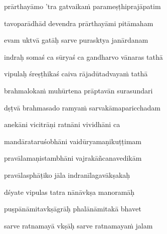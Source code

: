 prārthayāmo 'tra gatvaika\.m parameṣṭhiprajāpatim \veg\dontdisplaylinenum 

tavoparādhād devendra prārthayāmi pitāmaham\thinspace{\dandab} \dontdisplaylinenum

evam uktvā gatāḥ sarve purasktya janārdanam \veg\dontdisplaylinenum

indraḥ somaś ca sūryaś ca gandharvo vānaras tathā\thinspace{\dandab} \dontdisplaylinenum

vipulaḥ śreṣṭhikaś caiva rājadūtadvaya\.m tathā \veg\dontdisplaylinenum

brahmaloka\.m muhūrtena prāptavān surasundari\thinspace{\dandab} \dontdisplaylinenum

dṣṭvā brahmasado ramya\.m sarvakāmaparicchadam \veg\dontdisplaylinenum

anekāni vicitrāṇi ratnāni vividhāni ca\thinspace{\dandab} \dontdisplaylinenum

mandārataruśobhāni vaidūryamaṇikuṭṭimam \veg\dontdisplaylinenum

pravālamaṇistambhāni vajrakāñcanavedikām\thinspace{\dandab} \dontdisplaylinenum

pravālasphāṭiko jāla indranīlagavākṣakaḥ \veg\dontdisplaylinenum

dśyate vipulas tatra nānāvkṣa manoramāḥ\thinspace{\dandab} \dontdisplaylinenum

puṣpānāmitavkṣāgrāḥ phalānāmitakā bhavet \veg\dontdisplaylinenum

sarve ratnamayā vkṣāḥ sarve ratnamaya\.m jalam\thinspace{\dandab} \dontdisplaylinenum

